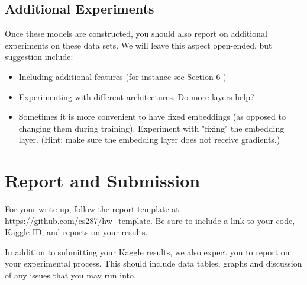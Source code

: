\documentclass[11pt]{article}
\begin{document}
\subsection{Additional Experiments}

Once these models are constructed, you should also report on
additional experiments on these data sets. We will leave this aspect
open-ended, but suggestion include:

\begin{itemize}
\item Including additional features (for instance see Section 6 \cite{c&w})
\item Experimenting with different architectures. Do more layers help? 
\item Sometimes it is more convenient to have fixed embeddings (as opposed to changing them during training). Experiment with "fixing" the embedding layer. (Hint: make sure the embedding layer does not receive gradients.)
\end{itemize}

\section{Report and Submission}

For your write-up, follow the report template at
\url{https://github.com/cs287/hw_template}. Be sure to include a link
to your code, Kaggle ID, and reports on your results.

In addition to submitting your Kaggle results, we also expect you to report on your 
experimental process. This should include data tables, graphs and discussion of any 
issues that you may run into. 

 

\end{document}
